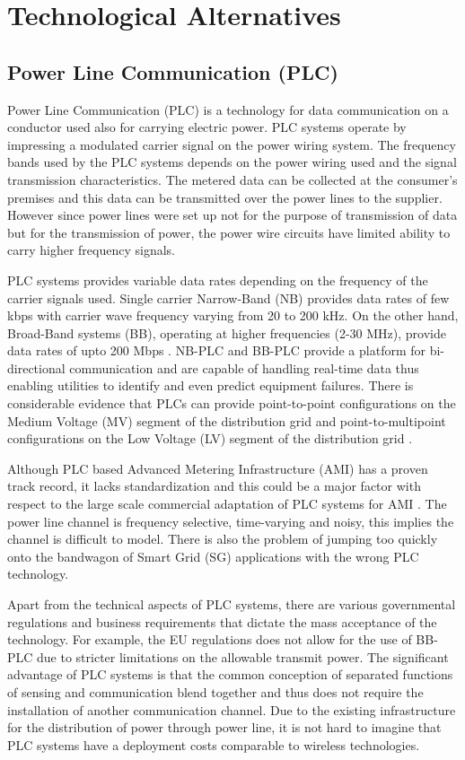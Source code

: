 \chapter{Technological Alternatives}
\section{Power Line Communication (PLC)}

Power Line Communication (PLC) is a technology for data communication on a conductor used also for carrying electric power. PLC systems operate by impressing a modulated carrier signal on the power wiring system. The frequency bands used by the PLC systems depends on the power wiring used and the signal transmission characteristics. The metered data can be collected at the consumer's premises and this data can be transmitted over the power lines to the supplier. However since power lines were set up not for the purpose of transmission of data but for the transmission of power, the power wire circuits have limited ability to carry higher frequency signals.

PLC systems provides variable data rates depending on the frequency of the carrier signals used. Single carrier Narrow-Band (NB) provides data rates of few kbps with carrier wave frequency varying from 20 to 200 kHz. On the other hand, Broad-Band systems (BB), operating at higher frequencies (2-30 MHz),  provide data rates of upto 200 Mbps \cite{PLC_galli}. NB-PLC and BB-PLC provide a platform for bi-directional communication and are capable of handling real-time data thus enabling utilities to identify and even predict equipment failures. There is considerable evidence that PLCs can provide point-to-point configurations on the Medium Voltage (MV) segment of the distribution grid and point-to-multipoint configurations on the Low Voltage (LV) segment of the distribution grid \cite{PLC_galli}.

Although PLC based Advanced Metering Infrastructure (AMI) has a proven track record, it lacks  standardization and this could be a major factor with respect to the large scale commercial adaptation of PLC systems for AMI \cite{PLC_galli}. The power line channel is frequency selective, time-varying and noisy, this implies the channel is difficult to model. There is also the problem of jumping too quickly onto the bandwagon of Smart Grid (SG) applications with the wrong PLC technology.

Apart from the technical aspects of PLC systems, there are various governmental regulations and business requirements that dictate the mass acceptance of the technology. For example, the EU regulations does not allow for the use of BB-PLC due to stricter limitations on the allowable transmit power. The significant advantage of PLC systems is that the common conception of separated functions of sensing and communication blend together and thus does not require the installation of another communication channel. Due to the existing infrastructure for the distribution of power through power line, it is not hard to imagine that PLC systems have a deployment costs comparable to wireless technologies. 

